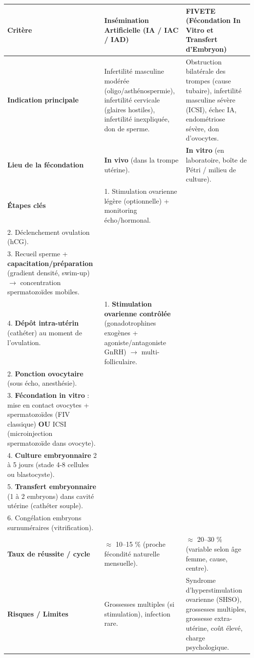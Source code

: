 \documentclass[11pt]{article}
\begin{document}
\begin{propriete}
\begin{center}
\begin{tabularx}{\linewidth}{|l|X|X|}\hline
\rowcolor{popblueL} \textbf{Critère} & \textbf{Insémination Artificielle (IA / IAC / IAD)} & \textbf{FIVETE (Fécondation In Vitro et Transfert d'Embryon)} \\ \hline
\textbf{Indication principale} & Infertilité masculine modérée (oligo/asthénospermie), infertilité cervicale (glaires hostiles), infertilité inexpliquée, don de sperme. & Obstruction bilatérale des trompes (cause tubaire), infertilité masculine sévère (ICSI), échec IA, endométriose sévère, don d'ovocytes. \\ \hline
\textbf{Lieu de la fécondation} & \textbf{In vivo} (dans la trompe utérine). & \textbf{In vitro} (en laboratoire, boîte de Pétri / milieu de culture). \\ \hline
\textbf{Étapes clés} & 1. Stimulation ovarienne légère (optionnelle) + monitoring écho/hormonal. \\
2. Déclenchement ovulation (hCG). \\
3. Recueil sperme + \textbf{capacitation/préparation} (gradient densité, swim-up) $\rightarrow$ concentration spermatozoïdes mobiles. \\
4. \textbf{Dépôt intra-utérin} (cathéter) au moment de l'ovulation. & 1. \textbf{Stimulation ovarienne contrôlée} (gonadotrophines exogènes + agoniste/antagoniste GnRH) $\rightarrow$ multi-folliculaire. \\
2. \textbf{Ponction ovocytaire} (sous écho, anesthésie). \\
3. \textbf{Fécondation in vitro} : mise en contact ovocytes + spermatozoïdes (FIV classique) \textbf{OU} ICSI (microinjection spermatozoïde dans ovocyte). \\
4. \textbf{Culture embryonnaire} 2 à 5 jours (stade 4-8 cellules ou blastocyste). \\
5. \textbf{Transfert embryonnaire} (1 à 2 embryons) dans cavité utérine (cathéter souple). \\
6. Congélation embryons surnuméraires (vitrification). \\ \hline
\textbf{Taux de réussite / cycle} & $\approx$ 10--15 \% (proche fécondité naturelle mensuelle). & $\approx$ 20--30 \% (variable selon âge femme, cause, centre). \\ \hline
\textbf{Risques / Limites} & Grossesses multiples (si stimulation), infection rare. & Syndrome d'hyperstimulation ovarienne (SHSO), grossesses multiples, grossesse extra-utérine, coût élevé, charge psychologique. \\ \hline
\end{tabularx}
\end{center}
\end{propriete}
\end{document}
